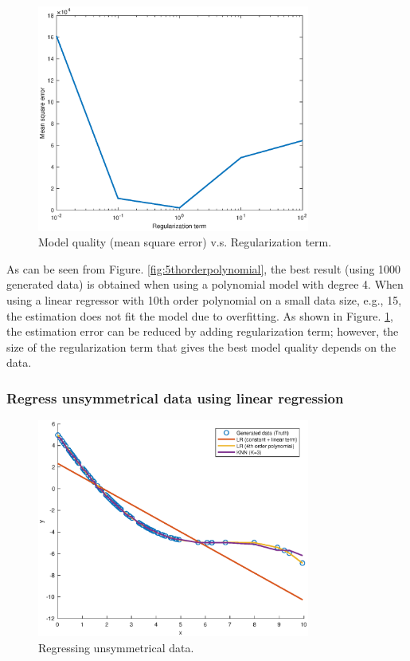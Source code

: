 \documentclass[]{article}
\begin{document}
\begin{figure}[H]
	\caption{Model quality (mean square error) v.s. Regularization term.}
	\label{fig:regularization}
	\centering
	\includegraphics[width=0.8\textwidth]{project32b2}
\end{figure}

As can be seen from Figure. \ref{fig:5thorderpolynomial}, the best result (using 1000 generated data) is obtained when using a polynomial model with degree 4. When using a linear regressor with 10th order polynomial on a small data size, e.g., 15, the estimation does not fit the model due to overfitting. As shown in Figure. \ref{fig:regularization}, the estimation error can be reduced by adding regularization term; however, the size of the regularization term that gives the best model quality depends on the data.

\subsubsection{Regress unsymmetrical data using linear regression}
\begin{figure}[H]
	\caption{Regressing unsymmetrical data.}
	\label{fig:unsymmetrical}
	\centering
	\includegraphics[width=0.8\textwidth]{project32c}
\end{figure}
\end{document}
